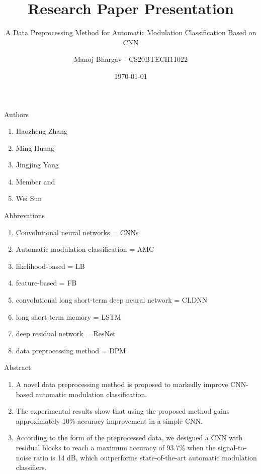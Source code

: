 \documentclass{beamer}
\title{\textbf{Research Paper Presentation}}
\subtitle
{\Large{A Data Preprocessing Method for Automatic Modulation Classification Based on CNN\\} 
                                        }  %
\author{Manoj Bhargav - CS20BTECH11022}
\institute{IITH}
\date{\today}
\begin{document}
\begin{frame}
\titlepage
\end{frame}
\begin{frame}{Authors}
\begin{enumerate}

\item Haozheng Zhang
\item Ming Huang 
\item Jingjing Yang
\item Member and 
\item Wei Sun
    
\end{enumerate}
\end{frame}
\begin{frame}{Abbrevations}
\begin{enumerate}
    \item Convolutional
neural networks = CNNs
\item Automatic modulation classification = AMC
\item likelihood-based = LB
\item feature-based = FB
\item convolutional long short-term deep
neural network = CLDNN
\item long short-term memory = LSTM
\item deep residual network = ResNet
\item data preprocessing
method = DPM
\end{enumerate}
\end{frame}

\begin{frame}{Abstract}
\begin{enumerate}[]
\item A novel data preprocessing
method is proposed to markedly improve CNN-based automatic
modulation classification.
\item The experimental
results show that using the proposed method gains
approximately 10\% accuracy improvement in a simple CNN.
\item According to the form of the preprocessed data,
we designed a CNN with residual blocks to reach a maximum
accuracy of 93.7\% when the signal-to-noise ratio is 14 dB, which
outperforms state-of-the-art automatic modulation classifiers.

 \end{enumerate}   
\end{frame}
\end{document}
